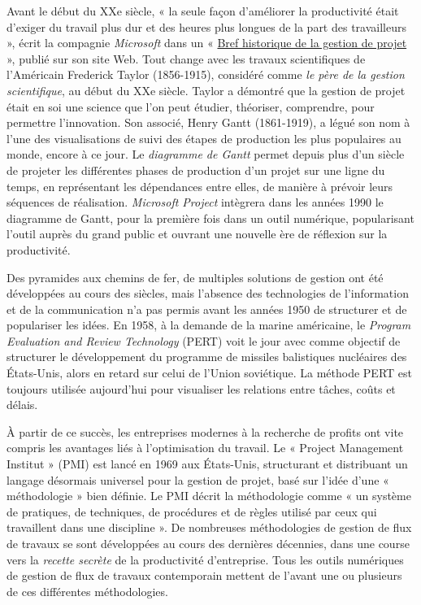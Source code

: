 \documentclass[
  letterpaper,
  DIV=11,
  numbers=noendperiod]{scrreprt}
\begin{document}
Avant le début du XXe siècle, « la seule façon d'améliorer la
productivité était d'exiger du travail plus dur et des heures plus
longues de la part des travailleurs », écrit la compagnie
\emph{Microsoft} dans un «
\href{https://support.microsoft.com/fr-fr/topic/bref-historique-de-la-gestion-de-projet-a2e0b717-094b-4d1e-878a-fcd0978891cd}{Bref
historique de la gestion de projet} », publié sur son site Web. Tout
change avec les travaux scientifiques de l'Américain Frederick Taylor
(1856-1915), considéré comme \emph{le père de la gestion scientifique},
au début du XXe siècle. Taylor a démontré que la gestion de projet était
en soi une science que l'on peut étudier, théoriser, comprendre, pour
permettre l'innovation. Son associé, Henry Gantt (1861-1919), a légué
son nom à l'une des visualisations de suivi des étapes de production les
plus populaires au monde, encore à ce jour. Le \emph{diagramme de Gantt}
permet depuis plus d'un siècle de projeter les différentes phases de
production d'un projet sur une ligne du temps, en représentant les
dépendances entre elles, de manière à prévoir leurs séquences de
réalisation. \emph{Microsoft Project} intègrera dans les années 1990 le
diagramme de Gantt, pour la première fois dans un outil numérique,
popularisant l'outil auprès du grand public et ouvrant une nouvelle ère
de réflexion sur la productivité.

Des pyramides aux chemins de fer, de multiples solutions de gestion ont
été développées au cours des siècles, mais l'absence des technologies de
l'information et de la communication n'a pas permis avant les années
1950 de structurer et de populariser les idées. En 1958, à la demande de
la marine américaine, le \emph{Program Evaluation and Review Technology}
(PERT) voit le jour avec comme objectif de structurer le développement
du programme de missiles balistiques nucléaires des États-Unis, alors en
retard sur celui de l'Union soviétique. La méthode PERT est toujours
utilisée aujourd'hui pour visualiser les relations entre tâches, coûts
et délais.

À partir de ce succès, les entreprises modernes à la recherche de
profits ont vite compris les avantages liés à l'optimisation du travail.
Le « Project Management Institut » (PMI) est lancé en 1969 aux
États-Unis, structurant et distribuant un langage désormais universel
pour la gestion de projet, basé sur l'idée d'une « méthodologie » bien
définie. Le PMI décrit la méthodologie comme « un système de pratiques,
de techniques, de procédures et de règles utilisé par ceux qui
travaillent dans une discipline ». De nombreuses méthodologies de
gestion de flux de travaux se sont développées au cours des dernières
décennies, dans une course vers la \emph{recette secrète} de la
productivité d'entreprise. Tous les outils numériques de gestion de flux
de travaux contemporain mettent de l'avant une ou plusieurs de ces
différentes méthodologies.
\end{document}
